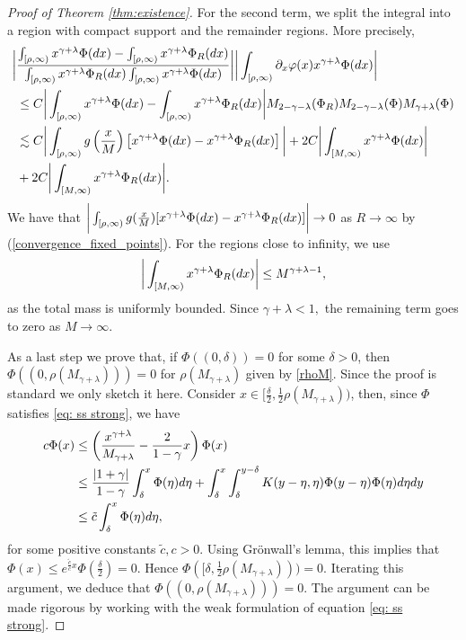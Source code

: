\documentclass[11pt]{article}
\numberwithin{equation}{section}
\theoremstyle{plain}
\newcommand{\der}{\textup{d}}
\begin{document}
\begin{proof}[Proof of Theorem \ref{thm:existence}]
For the second term, we split the integral into a region with compact support and the remainder regions. More precisely,
\begin{align*}
      \bigg| &\frac{\int_{[\rho,\infty)}x^{\gamma+\lambda}\Phi(\der x)-\int_{[\rho,\infty)}x^{\gamma+\lambda}\Phi_{R}(\der x)}{\int_{[\rho,\infty)}x^{\gamma+\lambda}\Phi_{R}(\der x)\int_{[\rho,\infty)}x^{\gamma+\lambda}\Phi(\der x)}\bigg|\bigg|\int_{[\rho,\infty)}\partial_{x}\varphi(x)x^{\gamma+\lambda}\Phi(\der x)\bigg|\\
     &\leq C\bigg|\int_{[\rho,\infty)}x^{\gamma+\lambda}\Phi(\der x)-\int_{[\rho,\infty)}x^{\gamma+\lambda}\Phi_{R}(\der x)\bigg|M_{2-\gamma-\lambda}(\Phi_{R})M_{2-\gamma-\lambda}(\Phi)M_{\gamma+\lambda}(\Phi)\\
     &\lesssim C\bigg|\int_{[\rho,\infty)}g\left(\frac{x}{M}\right)\left[x^{\gamma+\lambda}\Phi(\der x)-x^{\gamma+\lambda}\Phi_{R}(\der x)\right]\bigg|+2C\bigg|\int_{[M, \infty)}x^{\gamma+\lambda}\Phi(\der x)\bigg|\\
      &+2C\bigg|\int_{[M, \infty)}x^{\gamma+\lambda}\Phi_{R}(\der x)\bigg|.
\end{align*}
We have that $\bigg|\int_{[\rho, \infty)}g(\frac{x}{M})[x^{\gamma+\lambda}\Phi(\der x)-x^{\gamma+\lambda}\Phi_{R}(\der x)]\bigg|\rightarrow 0$ as $R\rightarrow\infty$ by (\ref{convergence_fixed_points}). For the regions close to infinity, we use
\begin{align*}
    \bigg|\int_{[M,\infty)}x^{\gamma+\lambda}\Phi_{R}(\der x)\bigg|\leq M^{\gamma+\lambda-1},
\end{align*}
as the total mass is uniformly bounded. Since $\gamma+\lambda<1,$ the remaining term goes to zero as $M\rightarrow\infty$.

As a last step we prove that, if $\Phi((0, \delta))=0$ for some $\delta >0$, then $\Phi((0, \rho(M_{\gamma+\lambda})))=0$ for $\rho(M_{\gamma+\lambda})$ given by \eqref{rhoM}. 
Since the proof is standard we only sketch it here. 
Consider $x \in [\frac{\delta}{2},\frac{1}{2}\rho(M_{\gamma+\lambda}))$, then, since $\Phi$ satisfies \eqref{eq: ss strong}, we have
\begin{align*}
c \Phi(x) & \leq \left( \frac{x^{\gamma+\lambda} }{M_{\gamma+\lambda}} - \frac{2}{1-\gamma} x \right) \Phi(x)\\
& \leq \frac{|1+\gamma |}{1-\gamma} \int_\delta^x \Phi(\eta ) \der \eta + \int_{\delta}^x  \int_\delta^{y-\delta} K(y-\eta,\eta) \Phi(y-\eta ) \Phi(\eta ) \der \eta \der y \\
&\leq \tilde{c} \int_\delta^x \Phi(\eta) \der \eta,
\end{align*}
for some positive constants $\tilde{c}, c >0$.
Using Gr\"onwall's lemma, this implies that $\Phi(x) \leq e^{\frac{\tilde{c}}{c} x }\Phi(\frac{\delta}{2}) =0$. Hence $\Phi([\delta, \frac{1}{2}\rho(M_{\gamma+\lambda})))=0$.
Iterating this argument, we deduce that $\Phi((0, \rho(M_{\gamma+\lambda} )))=0$.
The argument can be made rigorous by working with the weak formulation of equation \eqref{eq: ss strong}.
\end{proof}
\end{document}

